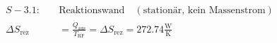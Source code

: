 

\item[c)] 
    \begin{align*}
        S - 3.1: \quad & \text{Reaktionswand} \quad (\text{stationär, kein Massenstrom}) \\
        \Delta S_{\text{rez}} &= \frac{\dot{Q}_{\text{aus}}}{T_{\text{RF}}} = \Delta S_{\text{rez}} = 272.74 \frac{\text{W}}{\text{K}}
    \end{align*}